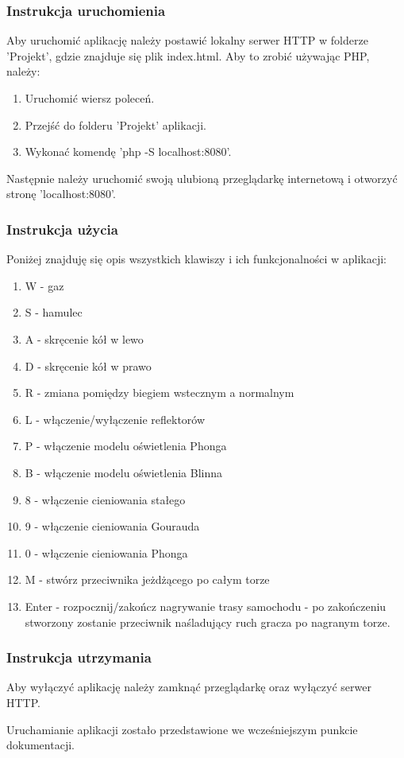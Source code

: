 \documentclass[11pt]{article}
\let\Oldsubsubsection\subsubsection
\renewcommand{\subsubsection}{\FloatBarrier\Oldsubsubsection}
\begin{document}
\subsubsection{Instrukcja uruchomienia}
\par
Aby uruchomić aplikację należy postawić lokalny serwer HTTP w folderze 'Projekt', gdzie znajduje się plik index.html. Aby to zrobić używając PHP, należy:
\begin{enumerate}
\item Uruchomić wiersz poleceń.
\item Przejść do folderu 'Projekt' aplikacji.
\item Wykonać komendę 'php -S localhost:8080'.
\end{enumerate}
Następnie należy uruchomić swoją ulubioną przeglądarkę internetową i otworzyć stronę 'localhost:8080'.

\subsubsection{Instrukcja użycia}
\par Poniżej znajduję się opis wszystkich klawiszy i ich funkcjonalności w aplikacji:
\begin{enumerate}
\item W - gaz
\item S - hamulec
\item A - skręcenie kół w lewo
\item D - skręcenie kół w prawo
\item R - zmiana pomiędzy biegiem wstecznym a normalnym
\item L - włączenie/wyłączenie reflektorów
\item P - włączenie modelu oświetlenia Phonga
\item B - włączenie modelu oświetlenia Blinna
\item 8 - włączenie cieniowania stałego
\item 9 - włączenie cieniowania Gourauda
\item 0 - włączenie cieniowania Phonga
\item M - stwórz przeciwnika jeżdżącego po całym torze
\item Enter - rozpocznij/zakończ nagrywanie trasy samochodu - po zakończeniu stworzony zostanie przeciwnik naśladujący ruch gracza po nagranym torze.
\end{enumerate}

\subsubsection{Instrukcja utrzymania}
\par
Aby wyłączyć aplikację należy zamknąć przeglądarkę oraz wyłączyć serwer HTTP.
\par
Uruchamianie aplikacji zostało przedstawione we wcześniejszym punkcie dokumentacji.
\par
\end{document}
